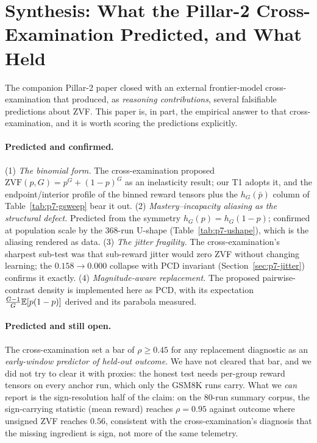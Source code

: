 \section{Synthesis: What the Pillar-2 Cross-Examination Predicted, and What
Held}
\label{sec:p7-synthesis}
The companion Pillar-2 paper closed with an external frontier-model
cross-examination that produced, as \emph{reasoning contributions},
several falsifiable predictions about ZVF. This paper is, in part, the
empirical answer to that cross-examination, and it is worth scoring the
predictions explicitly.

\paragraph{Predicted and confirmed.} (1) \emph{The binomial form.} The
cross-examination proposed $\mathrm{ZVF}(p, G) = p^G + (1-p)^G$ as an
inelasticity result; our T1 adopts it, and the endpoint/interior profile of
the binned reward tensors plus the $h_G(\bar p)$ column of
Table~\ref{tab:p7-gsweep} bear it out. (2) \emph{Mastery--incapacity
aliasing as the structural defect.} Predicted from the symmetry
$h_G(p) = h_G(1-p)$; confirmed at population scale by the 368-run U-shape
(Table~\ref{tab:p7-ushape}), which is the aliasing rendered as data.
(3) \emph{The jitter fragility.} The cross-examination's sharpest sub-test
was that sub-reward jitter would zero ZVF without changing learning; the
$0.158 \to 0.000$ collapse with PCD invariant
(Section~\ref{sec:p7-jitter}) confirms it exactly. (4) \emph{Magnitude-aware
replacement.} The proposed pairwise-contrast density is implemented here as
PCD, with its expectation $\frac{G-1}{G}\mathbb{E}[p(1-p)]$ derived and its parabola
measured.

\paragraph{Predicted and still open.} The cross-examination set a bar of
$\rho \geq 0.45$ for any replacement diagnostic as an \emph{early-window
predictor of held-out outcome}. We have not cleared that bar, and we did
not try to clear it with proxies: the honest test needs per-group reward
tensors on every anchor run, which only the GSM8K runs carry. What we
\emph{can} report is the sign-resolution half of the claim: on the 80-run
summary corpus, the sign-carrying statistic (mean reward) reaches
$\rho = 0.95$ against outcome where unsigned ZVF reaches $0.56$, consistent
with the cross-examination's diagnosis that the missing ingredient is sign,
not more of the same telemetry.

